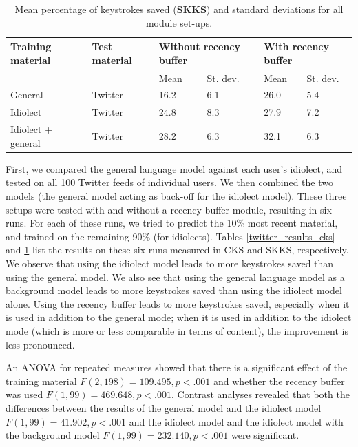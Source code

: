 \documentclass[12pt]{article}
\begin{document}
\begin{table}[htb] 
\centering
\begin{tabular}{ll|llll} 
Training material&Test material&\multicolumn{2}{l}{Without recency buffer}&\multicolumn{2}{l}{With recency buffer}\\
\hline
&&Mean&St. dev.&Mean&St. dev.\\
General&Twitter&16.2&6.1&26.0&5.4\\
Idiolect&Twitter&24.8&8.3&27.9&7.2\\
Idiolect + general&Twitter&28.2&6.3&32.1&6.3\\
\end{tabular} 
\caption{Mean percentage of keystrokes saved (\textbf{SKKS}) and standard deviations for all module set-ups.} \label{twitter_results_skks}
\end{table}

First, we compared the general language model against each user's idiolect, and tested on all 100 Twitter feeds of individual users. We then combined the two models (the general model acting as back-off for the idiolect model). These three setups were tested with and without a recency buffer module, resulting in six runs. For each of these runs, we tried to predict the 10\% most recent material, and trained on the remaining 90\% (for idiolects). Tables \ref{twitter_results_cks} and \ref{twitter_results_skks} list the results on these six runs measured in CKS and SKKS, respectively. We observe that using the idiolect model leads to more keystrokes saved than using the general model. We also see that using the general language model as a background model leads to more keystrokes saved than using the idiolect model alone. Using the recency buffer leads to more keystrokes saved, especially when it is used in addition to the general mode; when it is used in addition to the idiolect mode (which is more or less comparable in terms of content), the improvement is less pronounced.

An ANOVA for repeated measures showed that there is a significant effect of the training material $F(2,198) = 109.495, p < .001$ and whether the recency buffer was used $F(1,99) = 469.648, p < .001$. Contrast analyses revealed that both the differences between the results of the general model and the idiolect model $F(1,99) = 41.902, p < .001$ and the idiolect model and the idiolect model with the background model $F(1,99) = 232.140, p < .001$ were significant.
\end{document}
